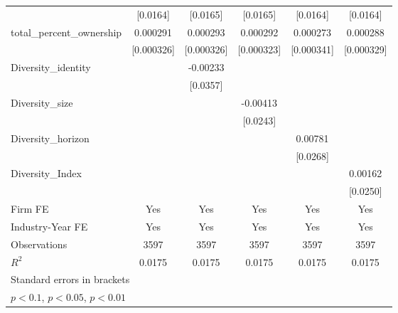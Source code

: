 {\begin{tabular}{l*{5}{c}}
            &    [0.0164]         &    [0.0165]         &    [0.0165]         &    [0.0164]         &    [0.0164]         \\
[1em]
total\_percent\_ownership&    0.000291         &    0.000293         &    0.000292         &    0.000273         &    0.000288         \\
            &  [0.000326]         &  [0.000326]         &  [0.000323]         &  [0.000341]         &  [0.000329]         \\
[1em]
Diversity\_identity&                     &    -0.00233         &                     &                     &                     \\
            &                     &    [0.0357]         &                     &                     &                     \\
[1em]
Diversity\_size&                     &                     &    -0.00413         &                     &                     \\
            &                     &                     &    [0.0243]         &                     &                     \\
[1em]
Diversity\_horizon&                     &                     &                     &     0.00781         &                     \\
            &                     &                     &                     &    [0.0268]         &                     \\
[1em]
Diversity\_Index&                     &                     &                     &                     &     0.00162         \\
            &                     &                     &                     &                     &    [0.0250]         \\
\hline
Firm FE     &         Yes         &         Yes         &         Yes         &         Yes         &         Yes         \\
Industry-Year FE&         Yes         &         Yes         &         Yes         &         Yes         &         Yes         \\
Observations&        3597         &        3597         &        3597         &        3597         &        3597         \\
$ R^2 $     &      0.0175         &      0.0175         &      0.0175         &      0.0175         &      0.0175         \\
\hline\hline
\multicolumn{6}{l}{\footnotesize Standard errors in brackets}\\
\multicolumn{6}{l}{\footnotesize \sym{*} \(p<0.1\), \sym{**} \(p<0.05\), \sym{***} \(p<0.01\)}\\
\end{tabular}
}
